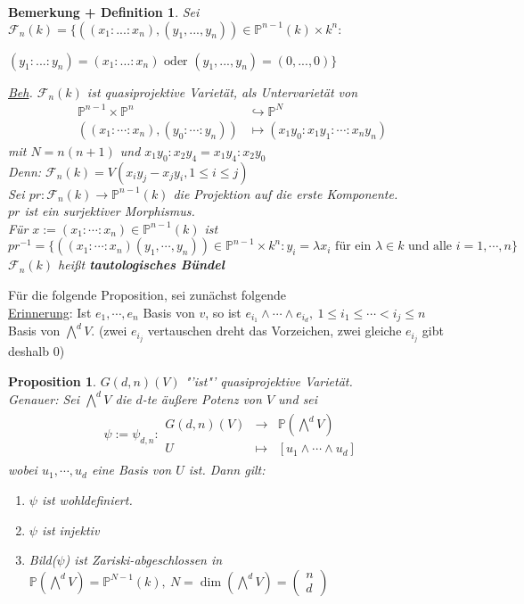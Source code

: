 \documentclass[a4paper,12pt]{report}
\theoremstyle{break}
\newtheorem{BemDef}[Def]{Bemerkung + Definition}
\newtheorem{Prop}[Def]{Proposition}
\theoremstyle{nonumberbreak}
\theoremstyle{nonumberplain}
\newcommand{\emp}[1]{\textbf{\emph{#1}}}
\newcommand{\begriff}[1]{{\index{#1}}\emp{#1}}
\newcommand{\Abb}[5]{\ensuremath{#1:\begin{array}{ccc} #2 & \longrightarrow & #3 \\ #4 & \longmapsto & #5 \end{array}}}
\begin{document}
\begin{BemDef}
\label{bemdef: 12.3}
Sei $\mathcal{F}_n(k)=\{((x_1:...:x_n),(y_1,..., y_n))\in \mathbb{P}^{n-1}(k)\times k^n:$
\begin{flushright}
$(y_1:...: y_n)=(x_1:\ldots:x_n) \text{~oder~} (y_1,...,y_n)=(0,...,0)\}$
 \end{flushright}
\underline{Beh}. $\mathcal{F}_n(k)$ ist quasiprojektive Varietät, als Untervarietät von
\begin{align*}
\mathbb{P}^{n-1}\times\mathbb{P}^n&\hookrightarrow \mathbb{P}^N\\
((x_1:\cdots:x_n),(y_0:\cdots:y_n))&\mapsto (x_1y_0 : x_1y_1 : \cdots : x_ny_n)
\end{align*}
mit $N=n(n+1)$ und $x_1y_0:x_2y_4=x_1y_4:x_2y_0$\\
Denn: $\mathcal{F}_n(k)=V(x_iy_j-x_jy_i,1\leq i\leq j)$\\
Sei $pr: \mathcal{F}_n(k) \rightarrow \mathbb{P}^{n-1}(k)$ die Projektion auf die erste Komponente.\\
$pr$ ist ein surjektiver Morphismus.\\
Für $x:= (x_1:\cdots :x_n)\in \mathbb{P}^{n-1}(k)$ ist
$$pr^{-1} = \{((x_1:\cdots:x_n)(y_1,\cdots,y_n))\in\mathbb{P}^{n-1}\times k^n: y_i=\lambda x_i \text{ für ein } \lambda\in k \text{~und~alle~} i = 1,\cdots, n\}$$
$\mathcal{F}_n(k)$ heißt \begriff{tautologisches Bündel} 
\end{BemDef}
Für die folgende Proposition, sei zunächst folgende\\
\underline{Erinnerung}: Ist $e_1,\cdots,e_n$ Basis von $v$, so ist $e_{i_1}\wedge\cdots\wedge e_{i_d},~1\leq i_1\leq\cdots<i_j\leq n$ Basis von $\bigwedge^dV$. (zwei $e_{i_j}$ vertauschen dreht das Vorzeichen, zwei gleiche $e_{i_j}$ gibt deshalb 0)
\begin{Prop}
\label{prop: 12.4}
$G(d,n)(V)$ "'ist"' quasiprojektive Varietät.\\
Genauer: Sei $\bigwedge^dV$ die $d$-te äußere Potenz von $V$ und sei 
\begin{align*}
\Abb{\psi:=\psi_{d,n}}{G(d,n)(V)}{\mathbb{P}(\bigwedge^dV)}{U}{[u_1\wedge\cdots\wedge u_d]}
\end{align*}
wobei $u_1,\cdots,u_d$ eine Basis von $U$ ist. Dann gilt:
\begin{enumerate}
\item $\psi$ ist wohldefiniert.
\item $\psi$ ist injektiv
\item Bild($\psi$) ist Zariski-abgeschlossen in $\mathbb{P}(\bigwedge^dV)=\mathbb P^{N-1}(k),
  ~N=\dim(\bigwedge^dV)=\left(\begin{array}{c} n \\ d \end{array} \right)$
\end{enumerate}
\end{Prop}
\end{document}
